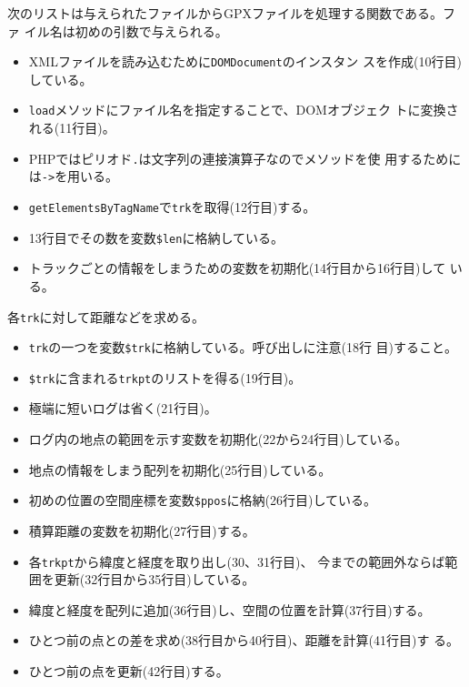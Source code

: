  次のリストは与えられたファイルからGPXファイルを処理する関数である。ファ
 イル名は初めの引数で与えられる。
 \begin{itemize}
  \item XMLファイルを読み込むために\texttt{DOMDocument}のインスタン
        スを作成(10行目)している。
  \item \texttt{load}メソッドにファイル名を指定することで、DOMオブジェク
        トに変換される(11行目)。
  \item PHPではピリオド\texttt{.}は文字列の連接演算子なのでメソッドを使
        用するためには\texttt{->}を用いる。
  \item \texttt{getElementsByTagName}で\texttt{trk}を取得(12行目)する。
  \item 13行目でその数を変数\texttt{\$len}に格納している。
  \item トラックごとの情報をしまうための変数を初期化(14行目から16行目)して
				いる。
 \end{itemize}
 各\texttt{trk}に対して距離などを求める。
 \begin{itemize}
  \item \texttt{trk}の一つを変数\texttt{\$trk}に格納している。呼び出しに注意(18行
        目)すること。
  \item \texttt{\$trk}に含まれる\texttt{trkpt}のリストを得る(19行目)。
  \item 極端に短いログは省く(21行目)。
  \item ログ内の地点の範囲を示す変数を初期化(22から24行目)している。
  \item 地点の情報をしまう配列を初期化(25行目)している。
  \item 初めの位置の空間座標を変数\texttt{\$ppos}に格納(26行目)している。
  \item 積算距離の変数を初期化(27行目)する。
 \end{itemize}
 \begin{itemize}
  \item 各\texttt{trkpt}から緯度と経度を取り出し(30、31行目)、
  今までの範囲外ならば範囲を更新(32行目から35行目)している。
  \item 緯度と経度を配列に追加(36行目)し、空間の位置を計算(37行目)する。
  \item ひとつ前の点との差を求め(38行目から40行目)、距離を計算(41行目)す
				る。
  \item ひとつ前の点を更新(42行目)する。
 \end{itemize}
